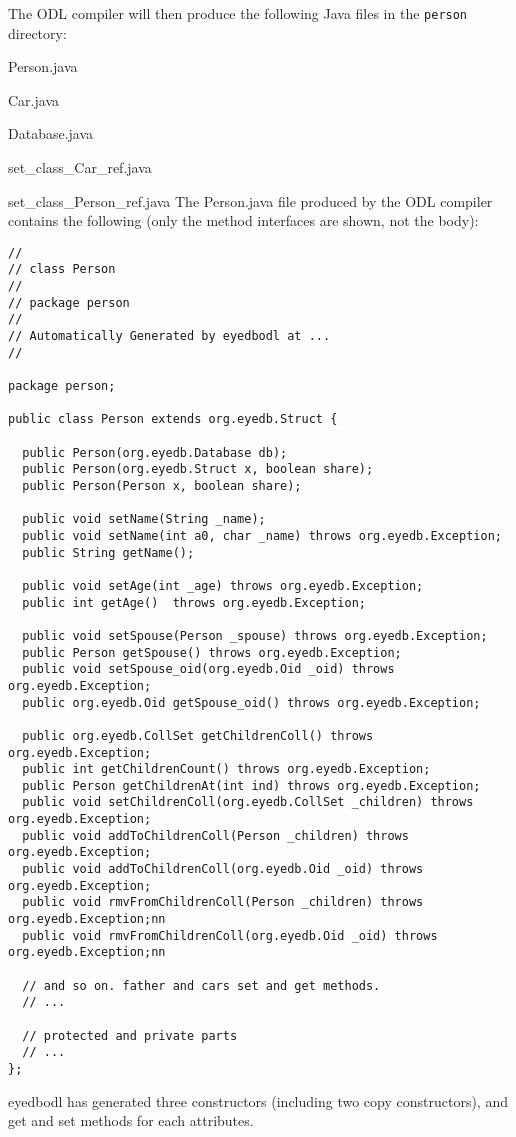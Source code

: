 The ODL compiler will then produce the following Java files in the \texttt{person} directory:
\bi
\item Person.java
\item Car.java
\item Database.java
\item set\_class\_Car\_ref.java
\item set\_class\_Person\_ref.java
\ei
The Person.java file produced by the ODL compiler contains the following
(only the method interfaces are shown, not the body):
{\verbsize \begin{verbatim}
//
// class Person
//
// package person
//
// Automatically Generated by eyedbodl at ...
//

package person;

public class Person extends org.eyedb.Struct {

  public Person(org.eyedb.Database db);
  public Person(org.eyedb.Struct x, boolean share);
  public Person(Person x, boolean share);

  public void setName(String _name);
  public void setName(int a0, char _name) throws org.eyedb.Exception;
  public String getName();

  public void setAge(int _age) throws org.eyedb.Exception;
  public int getAge()  throws org.eyedb.Exception;

  public void setSpouse(Person _spouse) throws org.eyedb.Exception;
  public Person getSpouse() throws org.eyedb.Exception;
  public void setSpouse_oid(org.eyedb.Oid _oid) throws org.eyedb.Exception;
  public org.eyedb.Oid getSpouse_oid() throws org.eyedb.Exception;
 
  public org.eyedb.CollSet getChildrenColl() throws org.eyedb.Exception;
  public int getChildrenCount() throws org.eyedb.Exception;
  public Person getChildrenAt(int ind) throws org.eyedb.Exception;
  public void setChildrenColl(org.eyedb.CollSet _children) throws org.eyedb.Exception;
  public void addToChildrenColl(Person _children) throws org.eyedb.Exception;
  public void addToChildrenColl(org.eyedb.Oid _oid) throws org.eyedb.Exception;
  public void rmvFromChildrenColl(Person _children) throws org.eyedb.Exception;nn
  public void rmvFromChildrenColl(org.eyedb.Oid _oid) throws org.eyedb.Exception;nn

  // and so on. father and cars set and get methods.
  // ...

  // protected and private parts
  // ...
};
\end{verbatim}
}
eyedbodl has generated three constructors (including two copy constructors),
and get and set methods for each attributes.

